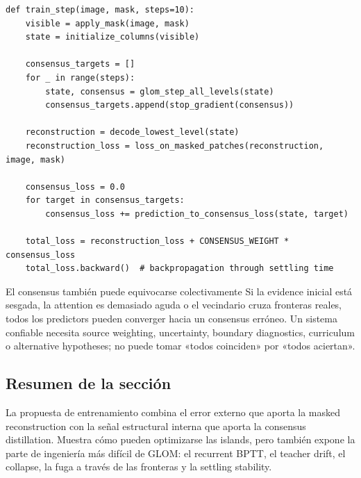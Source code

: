 \begin{lstlisting}[caption={Pseudocódigo didáctico de masked reconstruction y consensus training}]
def train_step(image, mask, steps=10):
    visible = apply_mask(image, mask)
    state = initialize_columns(visible)

    consensus_targets = []
    for _ in range(steps):
        state, consensus = glom_step_all_levels(state)
        consensus_targets.append(stop_gradient(consensus))

    reconstruction = decode_lowest_level(state)
    reconstruction_loss = loss_on_masked_patches(reconstruction, image, mask)

    consensus_loss = 0.0
    for target in consensus_targets:
        consensus_loss += prediction_to_consensus_loss(state, target)

    total_loss = reconstruction_loss + CONSENSUS_WEIGHT * consensus_loss
    total_loss.backward()  # backpropagation through settling time
\end{lstlisting}

\begin{warningbox}{El consensus también puede equivocarse colectivamente}
Si la evidence inicial está sesgada, la attention es demasiado aguda o el vecindario cruza fronteras reales, todos los predictors pueden converger hacia un consensus erróneo. Un sistema confiable necesita source weighting, uncertainty, boundary diagnostics, curriculum o alternative hypotheses; no puede tomar «todos coinciden» por «todos aciertan».
\end{warningbox}

\subsection{Resumen de la sección}

La propuesta de entrenamiento combina el error externo que aporta la masked reconstruction con la señal estructural interna que aporta la consensus distillation. Muestra cómo pueden optimizarse las islands, pero también expone la parte de ingeniería más difícil de GLOM: el recurrent BPTT, el teacher drift, el collapse, la fuga a través de las fronteras y la settling stability.
